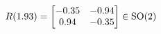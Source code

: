 \documentclass[preview]{standalone}
\begin{document}
\begin{align*}
\special{dvisvgm:raw <g id='unique000'>}R(1.93) = \begin{bmatrix} -0.35 & -0.94 \\ 0.94 & -0.35 \end{bmatrix} \in \text{SO}(2)\special{dvisvgm:raw </g>}
\end{align*}
\end{document}
